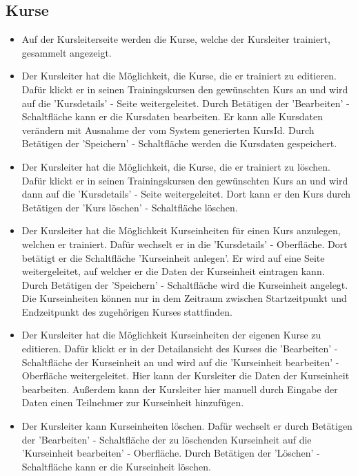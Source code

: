 \documentclass[a4paper]{scrreprt}
\begin{document}
		\subsection{Kurse}
			\begin{itemize}
				\item {}
					Auf der Kursleiterseite werden die Kurse, welche der Kursleiter trainiert, gesammelt angezeigt.
				\item {}
					Der Kursleiter hat die Möglichkeit, die Kurse, die er  trainiert zu editieren. Dafür klickt er in seinen Trainingskursen den gewünschten Kurs an und wird auf die 'Kursdetails' - Seite weitergeleitet. Durch Betätigen der 'Bearbeiten' - Schaltfläche kann er die Kursdaten bearbeiten. Er kann alle Kursdaten verändern mit Ausnahme der vom System generierten KursId. Durch Betätigen der 'Speichern' - Schaltfläche werden die Kursdaten gespeichert.
				\item {}
					Der Kursleiter hat die Möglichkeit, die Kurse, die er  trainiert zu löschen. Dafür klickt er in seinen Trainingskursen den gewünschten Kurs an und wird dann auf die 'Kursdetails' - Seite weitergeleitet. Dort kann er den Kurs durch Betätigen der 'Kurs löschen' - Schaltfläche löschen.
				\item {}
					Der Kursleiter hat die Möglichkeit Kurseinheiten für einen Kurs anzulegen, welchen er trainiert. Dafür wechselt er in die 'Kursdetails' - Oberfläche. Dort betätigt er die Schaltfläche 'Kurseinheit anlegen'. Er wird auf eine Seite weitergeleitet, auf welcher er die Daten der Kurseinheit eintragen kann. Durch Betätigen der 'Speichern' - Schaltfläche wird die Kurseinheit angelegt. Die Kurseinheiten können nur in dem Zeitraum zwischen Startzeitpunkt und Endzeitpunkt des zugehörigen Kurses stattfinden.
				\item {}
					Der Kursleiter hat die Möglichkeit Kurseinheiten der eigenen Kurse zu editieren. Dafür klickt er in der Detailansicht des Kurses die 'Bearbeiten' - Schaltfläche der Kurseinheit an und wird auf die 'Kurseinheit bearbeiten' - Oberfläche weitergeleitet. Hier kann der Kursleiter die Daten der Kurseinheit bearbeiten. Außerdem kann der Kursleiter hier manuell durch Eingabe der Daten einen Teilnehmer zur Kurseinheit hinzufügen.
				\item {}
					Der Kursleiter kann Kurseinheiten löschen. Dafür wechselt er durch Betätigen der 'Bearbeiten' - Schaltfläche der zu löschenden Kurseinheit auf die 'Kurseinheit bearbeiten' - Oberfläche. Durch Betätigen der 'Löschen' - Schaltfläche kann er die Kurseinheit löschen.

\end{itemize}
\end{document}
